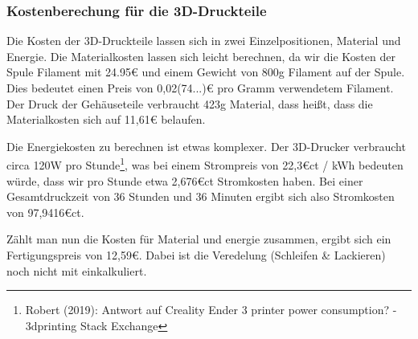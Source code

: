 \subsubsection{Kostenberechung für die 3D-Druckteile}
Die Kosten der 3D-Druckteile lassen sich in zwei Einzelpositionen, Material und Energie. Die Materialkosten lassen sich leicht berechnen, da wir die Kosten der Spule Filament mit 24.95\euro{} und einem Gewicht von 800g Filament auf der Spule. Dies bedeutet einen Preis von 0,02(74...)\euro{} pro Gramm verwendetem Filament. Der Druck der Gehäuseteile verbraucht 423g Material, dass heißt, dass die Materialkosten sich auf 11,61\euro{} belaufen.\par
Die Energiekosten zu berechnen ist etwas komplexer. Der 3D-Drucker verbraucht circa 120W pro Stunde\footnote{Robert (2019): Antwort auf Creality Ender 3 printer power consumption? - 3dprinting Stack Exchange}, was bei einem Strompreis von 22,3\euro{}ct / kWh bedeuten würde, dass wir pro Stunde etwa 2,676\euro{}ct Stromkosten haben. Bei einer Gesamtdruckzeit von 36 Stunden und 36 Minuten ergibt sich also Stromkosten von 97,9416\euro{}ct.\par
Zählt man nun die Kosten für Material und energie zusammen, ergibt sich ein Fertigungspreis von 12,59\euro{}. Dabei ist die Veredelung (Schleifen \& Lackieren) noch nicht mit einkalkuliert.\par